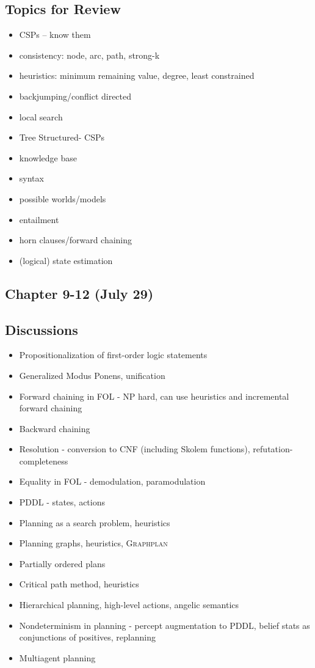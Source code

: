\subsection*{Topics for Review}
\begin{itemize}
\item CSPs -- know them
\item consistency: node, arc, path, strong-k
\item heuristics: minimum remaining value, degree, least constrained
\item backjumping/conflict directed
\item local search
\item Tree Structured- CSPs
\item knowledge base
\item syntax
\item possible worlds/models
\item entailment
\item horn clauses/forward chaining
\item (logical) state estimation
\end{itemize}

\subsection{Chapter 9-12 (July 29)}
\subsection*{Discussions}
\begin{itemize}
\item Propositionalization of first-order logic statements
\item Generalized Modus Ponens, unification
\item Forward chaining in FOL - NP hard, can use heuristics and incremental forward chaining
\item Backward chaining
\item Resolution - conversion to CNF (including Skolem functions), refutation-completeness
\item Equality in FOL - demodulation, paramodulation
\item PDDL - states, actions
\item Planning as a search problem, heuristics
\item Planning graphs, heuristics, \textsc{Graphplan}
\item Partially ordered plans
\item Critical path method, heuristics
\item Hierarchical planning, high-level actions, angelic semantics
\item Nondeterminism in planning - percept augmentation to PDDL, belief stats as conjunctions of positives, replanning
\item Multiagent planning
\end{itemize}

